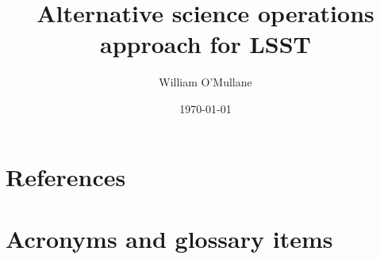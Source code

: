 \documentclass[OPS,authoryear,toc]{lsstdoc}
\title{Alternative science operations approach for  LSST }
\author{%
William O'Mullane
}
\date{\today}
\begin{document}

\mkshorttitle




\appendix
\section{References} \label{sec:bib}


\section{Acronyms and glossary items}\label{sec:acronyms}
\printglossaries

\end{document}
